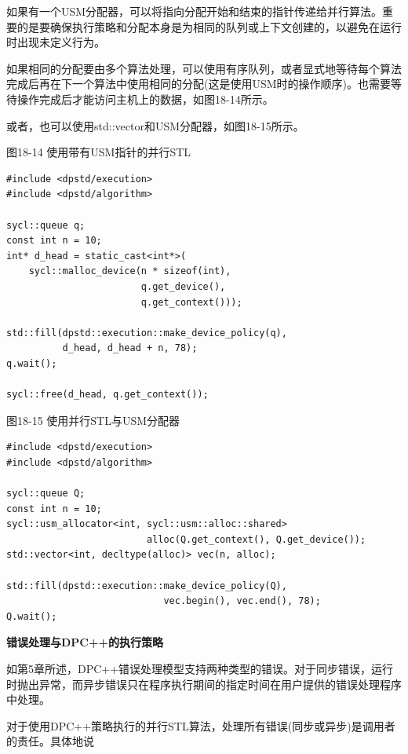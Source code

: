 如果有一个USM分配器，可以将指向分配开始和结束的指针传递给并行算法。重要的是要确保执行策略和分配本身是为相同的队列或上下文创建的，以避免在运行时出现未定义行为。\par

如果相同的分配要由多个算法处理，可以使用有序队列，或者显式地等待每个算法完成后再在下一个算法中使用相同的分配(这是使用USM时的操作顺序)。也需要等待操作完成后才能访问主机上的数据，如图18-14所示。\par

或者，也可以使用std::vector和USM分配器，如图18-15所示。\par

\hspace*{\fill} \par %
图18-14 使用带有USM指针的并行STL
\begin{lstlisting}[caption={}]
#include <dpstd/execution>
#include <dpstd/algorithm>

sycl::queue q;
const int n = 10;
int* d_head = static_cast<int*>(
	sycl::malloc_device(n * sizeof(int),
						q.get_device(), 
						q.get_context()));
						
std::fill(dpstd::execution::make_device_policy(q),
		  d_head, d_head + n, 78);
q.wait();

sycl::free(d_head, q.get_context());
\end{lstlisting}

\hspace*{\fill} \par %
图18-15 使用并行STL与USM分配器
\begin{lstlisting}[caption={}]
#include <dpstd/execution>
#include <dpstd/algorithm>

sycl::queue Q;
const int n = 10;
sycl::usm_allocator<int, sycl::usm::alloc::shared> 
						 alloc(Q.get_context(), Q.get_device());
std::vector<int, decltype(alloc)> vec(n, alloc);

std::fill(dpstd::execution::make_device_policy(Q), 
							vec.begin(), vec.end(), 78);
Q.wait();
\end{lstlisting}

\hspace*{\fill} \par %
\textbf{错误处理与DPC++的执行策略}

如第5章所述，DPC++错误处理模型支持两种类型的错误。对于同步错误，运行时抛出异常，而异步错误只在程序执行期间的指定时间在用户提供的错误处理程序中处理。\par

对于使用DPC++策略执行的并行STL算法，处理所有错误(同步或异步)是调用者的责任。具体地说\par

